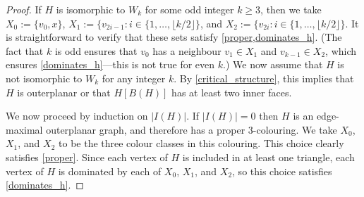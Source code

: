 \documentclass[12pt]{article}
\theoremstyle{definition}
\begin{document}
\begin{proof}
  If $H$ is isomorphic to $W_k$ for some odd integer $k\ge 3$, then we take $X_0:=\{v_0, x\}$, $X_1:=\{v_{2i-1}:i\in\{1,\ldots,\lfloor k/2\rfloor\}$, and $X_2:=\{v_{2i}:i\in\{1,\ldots,\lfloor k/2\rfloor\}$.  It is straightforward to verify that these sets satisfy \cref{proper,dominates_h}.  (The fact that $k$ is odd ensures that $v_0$ has a neighbour $v_1\in X_1$ and $v_{k-1}\in X_2$, which ensures \cref{dominates_h}---this is not true for even $k$.)   We now assume that $H$ is not isomorphic to $W_k$ for any integer $k$.  By \cref{critical_structure}, this implies that $H$ is outerplanar or that $H[B(H)]$ has at least two inner faces.

  We now proceed by induction on $|I(H)|$.  If $|I(H)|=0$ then $H$ is an edge-maximal outerplanar graph, and therefore has a proper $3$-colouring.  We take $X_0$, $X_1$, and $X_2$ to be the three colour classes in this colouring.  This choice clearly satisfies \cref{proper}. Since each vertex of $H$ is included in at least one triangle, each vertex of $H$ is dominated by each of $X_0$, $X_1$, and $X_2$, so this choice satisfies \cref{dominates_h}.


\end{proof}
\end{document}
